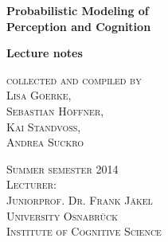 ﻿\begin{center}


\vspace{2cm}

\Large
\textbf{Probabilistic Modeling of \\Perception and Cognition}\\

\vspace{1cm}

\normalsize
\textbf{Lecture notes}\\

\vspace{3cm}

\textsc{collected and compiled by\\
Lisa Goerke,\\
Sebastian H\"offner,\\
Kai Standvoss,\\
Andrea Suckro\\}

\vspace{6cm}

\textsc{Summer semester 2014}\\
\vspace{1cm}
\textsc{Lecturer:\\
Juniorprof. Dr. Frank J\"akel}\\
\vspace{0.5cm}
\textsc{University Osnabr\"uck\\
Institute of Cognitive Science}\\


\end{center}